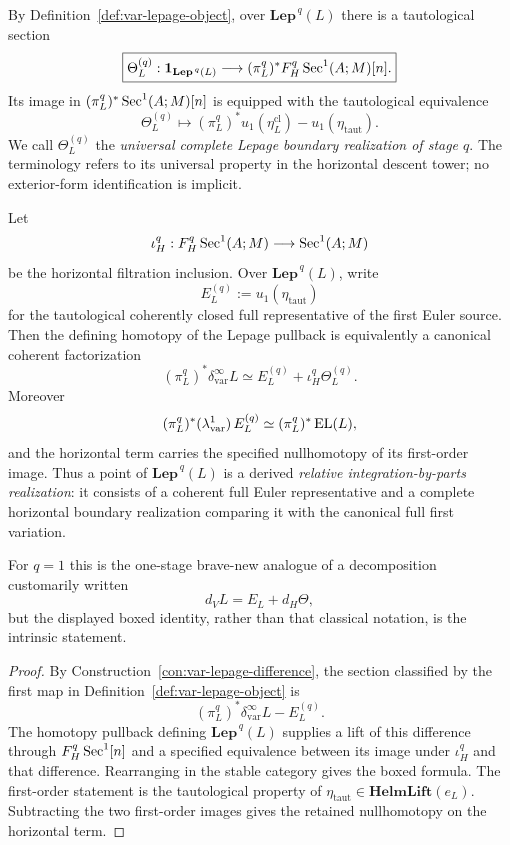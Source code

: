 \begin{construction}
\label{con:var-tautological-lepage}
By Definition~\ref{def:var-lepage-object}, over \(\mathbf{Lep}^{\,q}(L)\) there is a tautological section
\[
    \boxed{
    \Theta_L^{(q)}:
    \mathbf 1_{\mathbf{Lep}^{\,q}(L)}
    \longrightarrow
    (\pi_L^q)^*F_H^q\operatorname{Sec}^1(A;M)[n].
    }
\]
Its image in \((\pi_L^q)^*\operatorname{Sec}^1(A;M)[n]\) is equipped with the tautological equivalence
\[
    \Theta_L^{(q)}
    \longmapsto
    (\pi_L^q)^*u_1(\eta_L^{\mathrm{cl}})
    -
    u_1(\eta_{\mathrm{taut}}).
\]
We call \(\Theta_L^{(q)}\) the \emph{universal complete Lepage boundary realization of stage \(q\)}.  The terminology refers to its universal property in the horizontal descent tower; no exterior-form identification is implicit.
\end{construction}


\begin{theorem}
\label{thm:var-relative-integration-by-parts}
Let
\[
    \iota_H^q:
    F_H^q\operatorname{Sec}^1(A;M)
    \longrightarrow
    \operatorname{Sec}^1(A;M)
\]
be the horizontal filtration inclusion.  Over \(\mathbf{Lep}^{\,q}(L)\), write
\[
    E_L^{(q)}
    :=
    u_1(\eta_{\mathrm{taut}})
\]
for the tautological coherently closed full representative of the first Euler source.  Then the defining homotopy of the Lepage pullback is equivalently a canonical coherent factorization
\[
    \boxed{
    (\pi_L^q)^*\delta_{\mathrm{var}}^\infty L
    \simeq
    E_L^{(q)}
    +
    \iota_H^q\Theta_L^{(q)}.
    }
\]
Moreover
\[
    (\pi_L^q)^*(\lambda^1_{\mathrm{var}})\,E_L^{(q)}
    \simeq
    (\pi_L^q)^*\operatorname{EL}(L),
\]
and the horizontal term carries the specified nullhomotopy of its first-order image.  Thus a point of \(\mathbf{Lep}^{\,q}(L)\) is a derived \emph{relative integration-by-parts realization}: it consists of a coherent full Euler representative and a complete horizontal boundary realization comparing it with the canonical full first variation.

For \(q=1\) this is the one-stage brave-new analogue of a decomposition customarily written
\[
    d_VL=E_L+d_H\Theta,
\]
but the displayed boxed identity, rather than that classical notation, is the intrinsic statement.
\end{theorem}

\begin{proof}
By Construction~\ref{con:var-lepage-difference}, the section classified by the first map in Definition~\ref{def:var-lepage-object} is
\[
    (\pi_L^q)^*\delta_{\mathrm{var}}^\infty L
    -
    E_L^{(q)}.
\]
The homotopy pullback defining \(\mathbf{Lep}^{\,q}(L)\) supplies a lift of this difference through \(F_H^q\operatorname{Sec}^1[n]\) and a specified equivalence between its image under \(\iota_H^q\) and that difference.  Rearranging in the stable category gives the boxed formula.  The first-order statement is the tautological property of \(\eta_{\mathrm{taut}}\in\mathbf{HelmLift}(e_L)\).  Subtracting the two first-order images gives the retained nullhomotopy on the horizontal term.
\end{proof}


